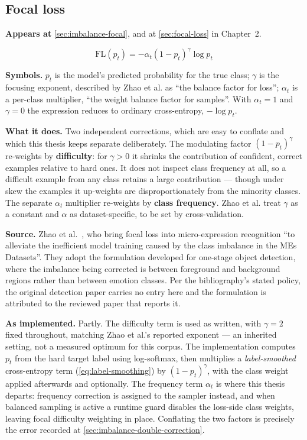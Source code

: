 \subsection{Focal loss}
\label{eq:focal}

\textbf{Appears at} \autoref{sec:imbalance-focal}, and at
\autoref{sec:focal-loss} in Chapter~2.

\[
	\text{FL}(p_t) = -\alpha_t (1 - p_t)^{\gamma}\log p_t
\]

\textbf{Symbols.} $p_t$ is the model's predicted probability for the true
class; $\gamma$ is the focusing exponent, described by Zhao et al. as ``the
balance factor for loss''; $\alpha_t$ is a per-class multiplier, ``the weight
balance factor for samples''. With $\alpha_t = 1$ and $\gamma = 0$ the
expression reduces to ordinary cross-entropy, $-\log p_t$.

\textbf{What it does.} Two independent corrections, which are easy to
conflate and which this thesis keeps separate deliberately. The modulating
factor $(1-p_t)^{\gamma}$ re-weights by \textbf{difficulty}: for $\gamma > 0$
it shrinks the contribution of confident, correct examples relative to hard
ones. It does not inspect class frequency at all, so a difficult example from
any class retains a large contribution --- though under skew the examples it
up-weights are disproportionately from the minority classes. The separate
$\alpha_t$ multiplier re-weights by \textbf{class frequency}. Zhao et al.
treat $\gamma$ as a constant and $\alpha$ as dataset-specific, to be set by
cross-validation.

\textbf{Source.} Zhao et al.~\cite{zhaoS2021}, who bring focal loss into
micro-expression recognition ``to alleviate the inefficient model training
caused by the class imbalance in the MEs Datasets''. They adopt the
formulation developed for one-stage object detection, where the imbalance
being corrected is between foreground and background regions rather than
between emotion classes. Per the bibliography's stated policy, the original
detection paper carries no entry here and the formulation is attributed to the
reviewed paper that reports it.

\textbf{As implemented.} Partly. The difficulty term is used as written, with
$\gamma = 2$ fixed throughout, matching Zhao et al.'s reported exponent --- an
inherited setting, not a measured optimum for this corpus. The implementation
computes $p_t$ from the hard target label using log-softmax, then multiplies a
\emph{label-smoothed} cross-entropy term (\autoref{eq:label-smoothing}) by
$(1-p_t)^{\gamma}$, with the class weight applied afterwards and optionally.
The frequency term $\alpha_t$ is where this thesis departs: frequency
correction is assigned to the sampler instead, and when balanced sampling is
active a runtime guard disables the loss-side class weights, leaving focal
difficulty weighting in place. Conflating the two factors is precisely the
error recorded at \autoref{sec:imbalance-double-correction}.

